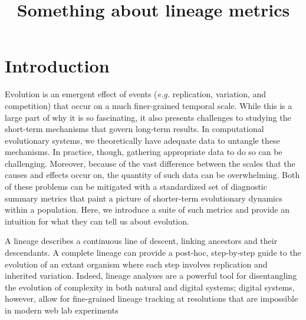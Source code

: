 \documentclass[letterpaper]{article}
\title{Something about lineage metrics}
\begin{document}
\maketitle

\begin{abstract}

\end{abstract}

\section{Introduction}

Evolution is an emergent effect of events (\textit{e.g.} replication, variation, and competition) that occur on a much finer-grained temporal scale. While this is a large part of why it is so fascinating, it also presents challenges to studying the short-term mechanisms that govern long-term results. In computational evolutionary systems, we theoretically have adequate data to untangle these mechanisms. In practice, though, gathering appropriate data to do so can be challenging. Moreover, because of the vast difference between the scales that the causes and effects occur on, the quantity of such data can be overwhelming. Both of these problems can be mitigated with a standardized set of diagnostic summary metrics that paint a picture of shorter-term evolutionary dynamics within a population. Here, we  introduce a suite of such metrics and provide an intuition for what they can tell us about evolution.






A lineage describes a continuous line of descent, linking ancestors and their descendants. A complete lineage can provide a post-hoc, step-by-step guide to the evolution of an extant organism where each step involves replication and inherited variation. Indeed, lineage analyses are a powerful tool for disentangling the evolution of complexity in both natural and digital systems; digital systems, however, allow for fine-grained lineage tracking at resolutions that are impossible in modern web lab experiments
\end{document}

